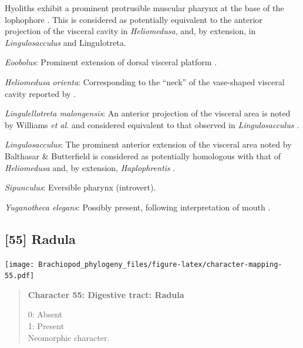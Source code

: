 \documentclass[openany]{book}
\begin{document}
Hyoliths exhibit a prominent protrusible muscular pharynx at the base of
the lophophore \citep{Moysiuk2017Hyolithsare}. This is considered as
potentially equivalent to the anterior projection of the visceral cavity
in \emph{Heliomedusa}, and, by extension, in \emph{Lingulosacculus} and
Lingulotreta.

\hypertarget{Eoobolus-coding-54}{}
\emph{Eoobolus}: Prominent extension of dorsal visceral platform
\citep{Balthasar2009Thebrachiopod}.

\hypertarget{Heliomedusa_orienta-coding-54}{}
\emph{Heliomedusa orienta}: Corresponding to the ``neck'' of the
vase-shaped visceral cavity reported by
\citet{Zhang2009Architectureand}.

\hypertarget{Lingulellotreta_malongensis-coding-54}{}
\emph{Lingulellotreta malongensis}: An anterior projection of the
visceral area is noted by Williams \emph{et al}.
\citeyearpar{Williams2000LinguliformeaCraniiformea} and considered
equivalent to that observed in \emph{Lingulosacculus}
\citep{Balthasar2009EarlyCambrian}.

\hypertarget{Lingulosacculus-coding-54}{}
\emph{Lingulosacculus}: The prominent anterior extension of the visceral
area noted by Balthasar \& Butterfield
\citeyearpar{Balthasar2009EarlyCambrian} is considered as potentially
homologous with that of \emph{Heliomedusa}
\citep{Zhang2009Architectureand} and, by extension, \emph{Haplophrentis}
\citep{Moysiuk2017Hyolithsare}.

\hypertarget{Sipunculus-coding-54}{}
\emph{Sipunculus}: Eversible pharynx (introvert).

\hypertarget{Yuganotheca_elegans-coding-54}{}
\emph{Yuganotheca elegans}: Possibly present, following interpretation
of mouth \citep[see fig. 2c, d in][]{Zhang2014Anearly}.

\subsection*{{[}55{]} Radula}\label{radula}

\texttt{[image: Brachiopod\_phylogeny\_files/figure-latex/character-mapping-55.pdf]}

\begin{quote}
\textbf{Character 55: Digestive tract: Radula}

0: Absent\\
1: Present\\
Neomorphic character.
\end{quote}
\end{document}
